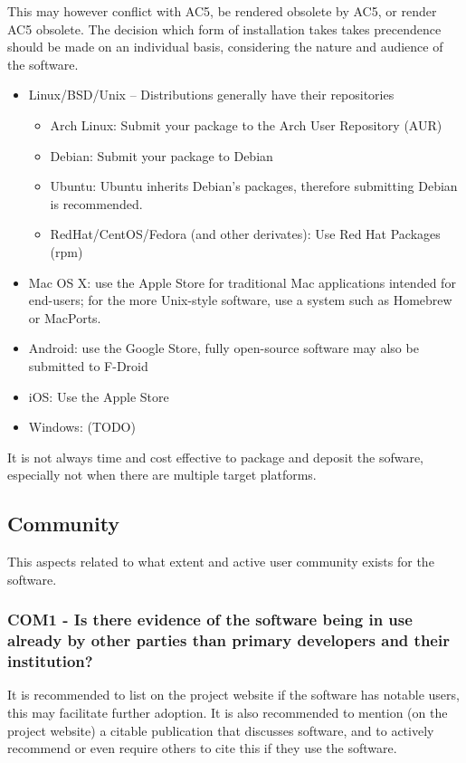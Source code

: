 \documentclass[a4paper,11pt]{article}
\begin{document}
This may however conflict with AC5, be rendered obsolete by AC5, or render AC5
obsolete. The decision which form of installation takes takes precendence should be
made on an individual basis, considering the nature and audience of the
software.

\begin{itemize}
    \item Linux/BSD/Unix -- Distributions generally have their repositories
    \begin{itemize}
        \item Arch Linux: Submit your package to the Arch User Repository (AUR)
        \item Debian: Submit your package to Debian
        \item Ubuntu: Ubuntu inherits Debian's packages, therefore submitting Debian is recommended.
        \item RedHat/CentOS/Fedora (and other derivates): Use Red Hat Packages (rpm)
    \end{itemize}
    \item Mac OS X: use the Apple Store for traditional Mac applications intended for end-users; for the more Unix-style
        software, use a system such as Homebrew or MacPorts.
    \item Android: use the Google Store, fully open-source software may also be
        submitted to F-Droid
    \item iOS: Use the Apple Store
    \item Windows: (TODO) 
\end{itemize}

It is not always time and cost effective to package and deposit the sofware, especially not
when there are multiple target platforms. 



\subsection{Community}

This aspects related to what extent and active user community exists for the
software.

\subsubsection{COM1 - Is there evidence of the software being in use already by
other parties than primary developers and their institution?}

It is recommended to list on the project website if the software has notable
users, this may facilitate further adoption. It is also recommended to mention
(on the project website) a citable publication that discusses software, and to
actively recommend or even require others to cite this if they use the
software.
\end{document}
